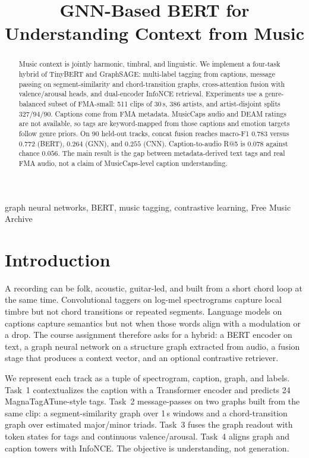 \documentclass[conference]{IEEEtran}
\title{GNN-Based BERT for Understanding Context from Music}
\author{\IEEEauthorblockA{\textit{CSE425 / EEE474 / CSE715 --- Neural Networks}\\
September 2026}}
\begin{document}
\maketitle

\begin{abstract}
Music context is jointly harmonic, timbral, and linguistic. We implement a four-task hybrid of TinyBERT and GraphSAGE: multi-label tagging from captions, message passing on segment-similarity and chord-transition graphs, cross-attention fusion with valence/arousal heads, and dual-encoder InfoNCE retrieval. Experiments use a genre-balanced subset of FMA-small: 511 clips of 30\,s, 386 artists, and artist-disjoint splits $327/94/90$. Captions come from FMA metadata. MusicCaps audio and DEAM ratings are not available, so tags are keyword-mapped from those captions and emotion targets follow genre priors. On 90 held-out tracks, concat fusion reaches macro-F1 $0.783$ versus $0.772$ (BERT), $0.264$ (GNN), and $0.255$ (CNN). Caption-to-audio R@5 is $0.078$ against chance $0.056$. The main result is the gap between metadata-derived text tags and real FMA audio, not a claim of MusicCaps-level caption understanding.
\end{abstract}

\begin{IEEEkeywords}
graph neural networks, BERT, music tagging, contrastive learning, Free Music Archive
\end{IEEEkeywords}

\section{Introduction}
A recording can be folk, acoustic, guitar-led, and built from a short chord loop at the same time. Convolutional taggers on log-mel spectrograms capture local timbre but not chord transitions or repeated segments. Language models on captions capture semantics but not when those words align with a modulation or a drop. The course assignment therefore asks for a hybrid: a BERT encoder on text, a graph neural network on a structure graph extracted from audio, a fusion stage that produces a context vector, and an optional contrastive retriever.

We represent each track as a tuple of spectrogram, caption, graph, and labels. Task~1 contextualizes the caption with a Transformer encoder and predicts 24 MagnaTagATune-style tags. Task~2 message-passes on two graphs built from the same clip: a segment-similarity graph over 1\,s windows and a chord-transition graph over estimated major/minor triads. Task~3 fuses the graph readout with token states for tags and continuous valence/arousal. Task~4 aligns graph and caption towers with InfoNCE. The objective is understanding, not generation.
\end{document}
